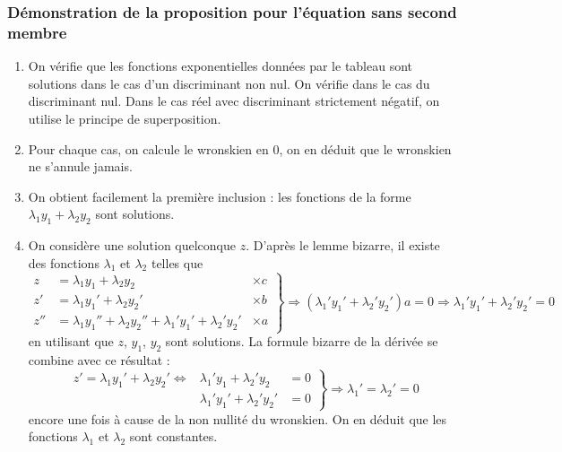 \subsubsection{Démonstration de la proposition pour l'équation sans second membre}
\begin{demo}
 \begin{enumerate}
  \item On vérifie que les fonctions exponentielles données par le tableau sont solutions dans le cas d'un discriminant non nul. On vérifie dans le cas du discriminant nul. Dans le cas réel avec discriminant strictement négatif, on utilise le principe de superposition.
  \item Pour chaque cas, on calcule le wronskien en $0$, on en déduit que le wronskien ne s'annule jamais.
  \item On obtient facilement la première inclusion : les fonctions de la forme $\lambda_1y_1 + \lambda_2y_2$ sont solutions.
  \item On considère une solution quelconque $z$. D'après le lemme bizarre, il existe des fonctions $\lambda_1$ et $\lambda_2$ telles que
\begin{displaymath}
 \left. 
\begin{aligned}
 z  &= \lambda_1 y_1 + \lambda_2 y_2  &\times c\\
 z' &= \lambda_1 y_1' + \lambda_2 y_2' &\times b\\
 z''&= \lambda_1 y_1'' + \lambda_2 y_2'' + \lambda_1' y_1' + \lambda_2' y_2' &\times a
\end{aligned}
\right\rbrace 
\Rightarrow
(\lambda_1' y_1' + \lambda_2' y_2')a = 0 
\Rightarrow
\lambda_1' y_1' + \lambda_2' y_2' = 0
\end{displaymath}
 en utilisant que $z$, $y_1$, $y_2$ sont solutions. La formule bizarre de la dérivée se combine avec ce résultat :
\begin{displaymath}
 \left. 
\begin{aligned}
 z' = \lambda_1 y_1' + \lambda_2 y_2'\Leftrightarrow& \lambda_1' y_1 + \lambda_2' y_2 &=0\\
 & \lambda_1' y_1' + \lambda_2' y_2' &= 0
\end{aligned}
\right\rbrace\Rightarrow
\lambda_1' = \lambda_2'=0 
\end{displaymath}
encore une fois à cause de la non nullité du wronskien. On en déduit que les fonctions $\lambda_1$ et $\lambda_2$ sont constantes.
 \end{enumerate}
\end{demo}


